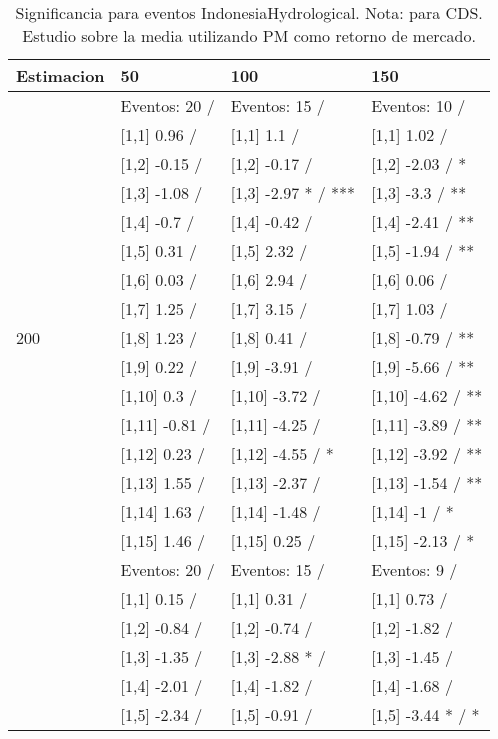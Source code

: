 \begin{table}

\caption{Significancia para eventos IndonesiaHydrological. Nota: para CDS. Estudio sobre la media utilizando PM como retorno de mercado.}
\centering
\begin{tabular}[t]{llll}
\toprule
Estimacion & 50 & 100 & 150\\
\midrule
 & Eventos:  20 / & Eventos:  15 / & Eventos:  10 /\\
 & {}[1,1] 0.96  / & {}[1,1] 1.1  / & {}[1,1] 1.02  /\\
 & {}[1,2] -0.15  / & {}[1,2] -0.17  / & {}[1,2] -2.03  / *\\
 & {}[1,3] -1.08  / & {}[1,3] -2.97 * / *** & {}[1,3] -3.3  / **\\
 & {}[1,4] -0.7  / & {}[1,4] -0.42  / & {}[1,4] -2.41  / **\\
\addlinespace
 & {}[1,5] 0.31  / & {}[1,5] 2.32  / & {}[1,5] -1.94  / **\\
 & {}[1,6] 0.03  / & {}[1,6] 2.94  / & {}[1,6] 0.06  /\\
 & {}[1,7] 1.25  / & {}[1,7] 3.15  / & {}[1,7] 1.03  /\\
200 & {}[1,8] 1.23  / & {}[1,8] 0.41  / & {}[1,8] -0.79  / **\\
 & {}[1,9] 0.22  / & {}[1,9] -3.91  / & {}[1,9] -5.66  / **\\
\addlinespace
 & {}[1,10] 0.3  / & {}[1,10] -3.72  / & {}[1,10] -4.62  / **\\
 & {}[1,11] -0.81  / & {}[1,11] -4.25  / & {}[1,11] -3.89  / **\\
 & {}[1,12] 0.23  / & {}[1,12] -4.55  / * & {}[1,12] -3.92  / **\\
 & {}[1,13] 1.55  / & {}[1,13] -2.37  / & {}[1,13] -1.54  / **\\
 & {}[1,14] 1.63  / & {}[1,14] -1.48  / & {}[1,14] -1  / *\\
\addlinespace
 & {}[1,15] 1.46  / & {}[1,15] 0.25  / & {}[1,15] -2.13  / *\\
 & Eventos:  20 / & Eventos:  15 / & Eventos:  9 /\\
 & {}[1,1] 0.15  / & {}[1,1] 0.31  / & {}[1,1] 0.73  /\\
 & {}[1,2] -0.84  / & {}[1,2] -0.74  / & {}[1,2] -1.82  /\\
 & {}[1,3] -1.35  / & {}[1,3] -2.88 * / & {}[1,3] -1.45  /\\
\addlinespace
 & {}[1,4] -2.01  / & {}[1,4] -1.82  / & {}[1,4] -1.68  /\\
 & {}[1,5] -2.34  / & {}[1,5] -0.91  / & {}[1,5] -3.44 * / *\\

\end{tabular}
\end{table}

